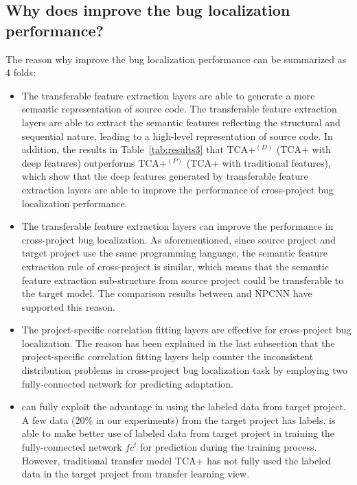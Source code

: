 \subsection{Why does \TRANPCNN improve the bug localization performance?}
The reason why \TRANPCNN improve the bug localization performance can be summarized as 4 folds:
\begin{itemize}
\item The transferable feature extraction layers are able to generate a more semantic representation of source code. The transferable feature extraction layers are able to extract the semantic features reflecting the structural and sequential nature, leading to a high-level representation of source code. In addition, the results in Table~\ref{tab:results3} that TCA+$^{(D)}$ (TCA+ with deep features) outperforms TCA+$^{(P)}$ (TCA+ with traditional features), which show that the deep features generated by transferable feature extraction layers are able to improve the performance of cross-project bug localization performance. 
\item The transferable feature extraction layers can improve the performance in cross-project bug localization. As aforementioned, since source project and target project use the same programming language, the semantic feature extraction rule of cross-project is similar, which means that the semantic feature extraction sub-structure from source project could be transferable to the target model. The comparison results between \TRANPCNN and NPCNN have supported this reason. 
\item The project-specific correlation fitting layers are effective for cross-project bug localization. The reason has been explained in the last subsection that the project-specific correlation fitting layers help counter the inconsistent distribution problems in cross-project bug localization task by employing two fully-connected network for predicting adaptation.
\item \TRANPCNN can fully exploit the advantage in using the labeled data from target project. A few data (20\% in our experiments) from the target project has labels. \TRANPCNN is able to make better use of labeled data from target project in training the fully-connected network $fc^t$ for prediction during the training process. However, traditional transfer model TCA+ has not fully used the labeled data in the target project from transfer learning view. 
\end{itemize}



